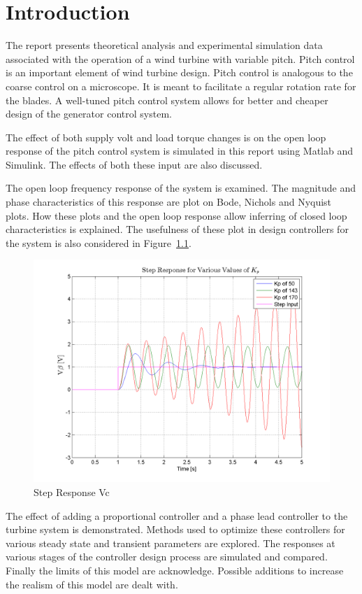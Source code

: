 \newpage
\chapter{Introduction}

The report presents theoretical analysis and experimental simulation data associated with the operation of a wind turbine with variable pitch. Pitch control is an important element of wind turbine design. Pitch control is analogous to the coarse control on a microscope. It is meant to facilitate a regular rotation rate for the blades. A well-tuned pitch control system allows for better and cheaper design of the generator control system. 

The effect of both supply volt and load torque changes is on the open loop response of the pitch control system is simulated in this report using Matlab and Simulink. The effects of both these input are also discussed.


The open loop frequency response of the system is examined. The magnitude and phase characteristics of this response are plot on Bode, Nichols and Nyquist plots. How these plots and the open loop response allow inferring of closed loop characteristics is explained. The usefulness of these plot in design controllers for the system is also considered in Figure~\ref{VbStep}.

\begin{figure}[htp]
\includegraphics[width=\textwidth]{./img/StepResponseVb}
\caption{Step Response Vc}
\label{VbStep}
\end{figure}

The effect of adding a proportional controller and a phase lead controller to the turbine system is demonstrated. Methods used to optimize these controllers for various steady state and transient parameters are explored. The responses at various stages of the controller design process are simulated and compared.
Finally the limits of this model are acknowledge. Possible additions to increase the realism of this model are dealt with.

